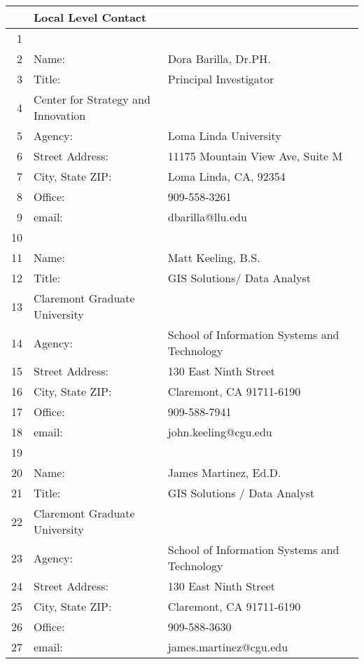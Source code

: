 \documentclass[11pt]{article}\usepackage[]{graphicx}\usepackage[]{color}
\begin{document}
\begin{table}[ht]
\centering
\begin{tabular}{rll}
  \hline
 & Local Level Contact&  \\ 
  \hline
1 &  &  \\ 
  2 & Name:  & Dora Barilla, Dr.PH. \\ 
  3 & Title:  & Principal Investigator \\ 
  4 & Center for Strategy and Innovation &  \\ 
  5 & Agency:  & Loma Linda University \\ 
  6 & Street Address:  & 11175 Mountain View Ave, Suite M \\ 
  7 & City, State ZIP:  & Loma Linda, CA, 92354 \\ 
  8 & Office:  & 909-558-3261 \\ 
  9 & email:  & dbarilla@llu.edu \\ 
   \hline
  10 &  &  \\ 
  11 & Name:  & Matt Keeling, B.S. \\ 
  12 & Title:  & GIS Solutions/ Data Analyst \\ 
  13 &                         Claremont Graduate University &  \\ 
  14 & Agency:  & School of Information Systems and Technology \\ 
  15 & Street Address:  & 130 East Ninth Street \\ 
  16 & City, State ZIP:  & Claremont, CA 91711-6190 \\ 
  17 & Office:  & 909-588-7941 \\ 
  18 & email: & john.keeling@cgu.edu \\ 
   \hline
  19 &  &  \\ 
  20 & Name:  & James Martinez, Ed.D. \\ 
  21 & Title:  & GIS Solutions / Data Analyst  \\ 
  22 &                         Claremont Graduate University &  \\ 
  23 & Agency:  & School of Information Systems and Technology \\ 
  24 & Street Address:  & 130 East Ninth Street \\ 
  25 & City, State ZIP:  & Claremont, CA 91711-6190 \\ 
  26 & Office:  & 909-588-3630 \\ 
  27 & email: & james.martinez@cgu.edu \\ 
   \hline
\end{tabular}
\end{table}
\end{document}
